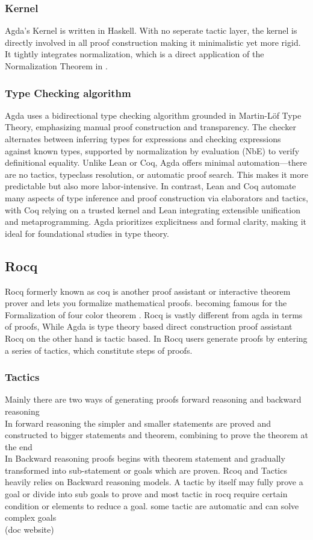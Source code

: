 \documentclass[12pt]{article}
\begin{document}
\subsubsection {Kernel}
Agda's Kernel is written in Haskell. With no seperate tactic layer, the kernel is directly involved in all proof construction making it minimalistic yet more rigid. It tightly integrates normalization, which is a direct application of the Normalization Theorem in \cite{martinlof1972intuitionistic_theory}.

\subsubsection{ Type Checking algorithm}
Agda uses a bidirectional type checking algorithm grounded in Martin-Löf Type Theory, emphasizing manual proof construction and transparency. The checker alternates between inferring types for expressions and checking expressions against known types, supported by normalization by evaluation (NbE) to verify definitional equality. Unlike Lean or Coq, Agda offers minimal automation—there are no tactics, typeclass resolution, or automatic proof search. This makes it more predictable but also more labor-intensive. In contrast, Lean and Coq automate many aspects of type inference and proof construction via elaborators and tactics, with Coq relying on a trusted kernel and Lean integrating extensible unification and metaprogramming. Agda prioritizes explicitness and formal clarity, making it ideal for foundational studies in type theory.
\cite{depPUlf}
\subsection{Rocq}
Rocq formerly known as coq is another proof assistant or interactive theorem prover and lets you formalize mathematical proofs. becoming famous for the Formalization of four color theorem  .
Rocq is vastly different from agda in terms of proofs, While Agda is type theory based direct construction proof assistant Rocq on the other hand is tactic based. 
In Rocq users generate proofs by entering a series of tactics, which constitute steps of proofs.
\subsubsection{Tactics}
    Mainly there are two ways of generating proofs forward reasoning and backward reasoning  \\ 
    In forward reasoning the simpler and smaller statements are proved and constructed to bigger statements and theorem, combining to prove the theorem at the end \\
    In Backward reasoning proofs begins with theorem statement and gradually transformed into sub-statement or goals which are proven. 
    Rcoq and Tactics heavily relies on Backward reasoning models.
    A tactic by itself may fully prove a goal or divide into sub goals to prove and most tactic in rocq require certain condition or elements to reduce a goal.
    some tactic are automatic and can solve complex goals\\ (doc website)
\end{document}
